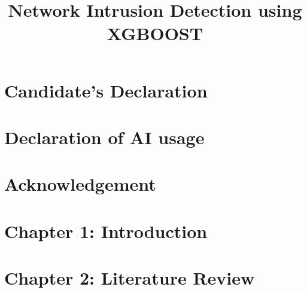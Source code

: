\documentclass[12pt,oneside,letterpaper,english]{article}
\title{Network Intrusion Detection using XGBOOST}
\begin{document}

\newpage

\hfuzz=50pt




\section*{Candidate's Declaration}

\newpage

\section*{Declaration of AI usage}

\newpage


\section*{Acknowledgement}

\newpage

\rhead{\nouppercase{\textit{\leftmark}}}

\doublespacing
\renewcommand{\baselinestretch}{1}\normalsize
\tableofcontents
\renewcommand{\baselinestretch}{1}\normalsize
\thispagestyle{fancy} %
\newpage



\newpage

\section{Chapter 1: Introduction} \label{intro}
 
\newpage

\section{Chapter 2: Literature Review} \label{lit}
 
\newpage
\end{document}
